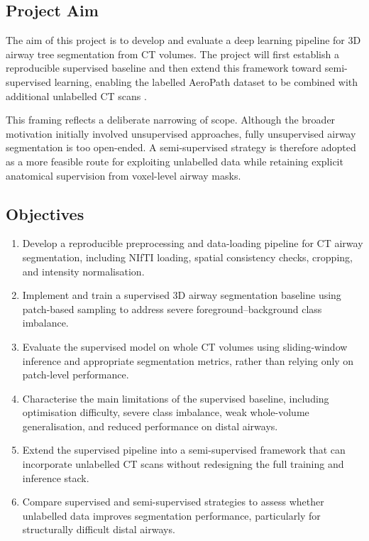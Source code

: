 \documentclass[11pt,a4paper]{article}
\begin{document}
\subsection{Project Aim}
The aim of this project is to develop and evaluate a deep learning pipeline for 3D airway tree segmentation from CT volumes. The project will first establish a reproducible supervised baseline and then extend this framework toward semi-supervised learning, enabling the labelled AeroPath dataset to be combined with additional unlabelled CT scans \cite{Stoverud2024AeroPath}. 

This framing reflects a deliberate narrowing of scope. Although the broader motivation initially involved unsupervised approaches, fully unsupervised airway segmentation is too open-ended. A semi-supervised strategy is therefore adopted as a more feasible route for exploiting unlabelled data while retaining explicit anatomical supervision from voxel-level airway masks.

\subsection{Objectives}
\begin{enumerate}
    \item Develop a reproducible preprocessing and data-loading pipeline for CT airway segmentation, including NIfTI loading, spatial consistency checks, cropping, and intensity normalisation.
    \item Implement and train a supervised 3D airway segmentation baseline using patch-based sampling to address severe foreground--background class imbalance.
    \item Evaluate the supervised model on whole CT volumes using sliding-window inference and appropriate segmentation metrics, rather than relying only on patch-level performance.
    \item Characterise the main limitations of the supervised baseline, including optimisation difficulty, severe class imbalance, weak whole-volume generalisation, and reduced performance on distal airways.
    \item Extend the supervised pipeline into a semi-supervised framework that can incorporate unlabelled CT scans without redesigning the full training and inference stack.
    \item Compare supervised and semi-supervised strategies to assess whether unlabelled data improves segmentation performance, particularly for structurally difficult distal airways.
\end{enumerate}
\end{document}
